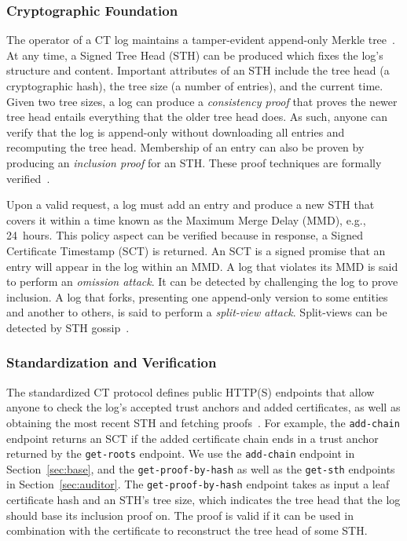 \subsubsection{Cryptographic Foundation}
The operator of a CT log maintains a tamper-evident append-only Merkle
tree~\cite{ct,ct/bis}.  At any time, a Signed Tree Head (STH) can be produced
which fixes the log's structure and content.  Important attributes of an STH
include
	the tree head (a cryptographic hash),
	the tree size (a number of entries), and
	the current time.
Given two tree sizes, a log can produce a \emph{consistency proof} that proves
the newer tree head entails everything that the older tree head does.  As such,
anyone can verify that the log is append-only without downloading all entries
and recomputing the tree head.  Membership of an entry can also be proven
by producing an \emph{inclusion proof} for an STH\@.  These proof techniques are
formally verified~\cite{secure-logging-and-ct}.

Upon a valid request, a log must add an entry and produce a new STH that covers
it within a time known as the Maximum Merge Delay (MMD), e.g., 24~hours.  This
policy aspect can be verified because in response, a Signed Certificate
Timestamp (SCT) is returned.  An SCT is a signed promise that an entry will
appear in the log within an MMD.  A log that violates its MMD is said to perform
an \emph{omission attack}.  It can be detected by challenging the log to prove
inclusion.  A log that forks, presenting one append-only version
to some entities and another to others, is said to perform a \emph{split-view
attack}.  Split-views can be detected by STH
gossip~\cite{chuat,dahlberg,nordberg,syta}.

\subsubsection{Standardization and Verification}
The standardized CT protocol defines public HTTP(S) endpoints that allow anyone
to check the log's accepted trust anchors and added certificates, as well as
obtaining the most recent STH and fetching proofs~\cite{ct,ct/bis}.  For
example, the \texttt{add-chain} endpoint returns an SCT if the added certificate
chain ends in a trust anchor returned by the \texttt{get-roots} endpoint.  We
use the \texttt{add-chain} endpoint in Section~\ref{sec:base}, and the
\texttt{get-proof-by-hash} as well as the \texttt{get-sth} endpoints in
Section~\ref{sec:auditor}.  The \texttt{get-proof-by-hash} endpoint takes as
input a leaf certificate hash and an STH's tree size, which indicates the tree
head that the log should base its inclusion proof on.  The proof is valid if it
can be used in combination with the certificate to reconstruct the tree head of
some STH.

